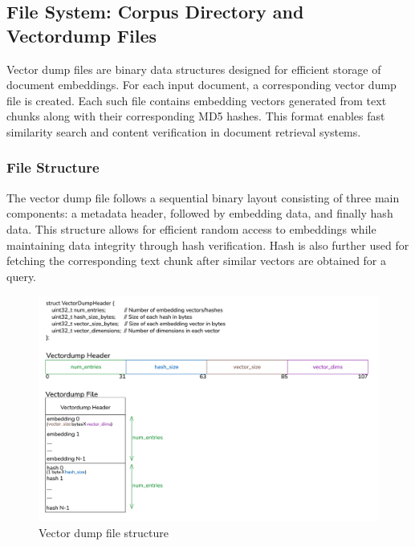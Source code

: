 \subsection{File System: Corpus Directory and Vectordump Files}
\label{subsec:FSandVectordump_files}
Vector dump files are binary data structures designed for efficient storage of document embeddings. For each input document, a corresponding vector dump file is created. Each such file contains embedding vectors generated from text chunks along with their corresponding MD5 hashes. This format enables fast similarity search and content verification in document retrieval systems.

\subsubsection{File Structure}
\label{subsec:Vectordump_FileStructure}
The vector dump file follows a sequential binary layout consisting of three main components: a metadata header, followed by embedding data, and finally hash data. This structure allows for efficient random access to embeddings while maintaining data integrity through hash verification. Hash is also further used for fetching the corresponding text chunk after similar vectors are obtained for a query.

   \begin{figure}[H]
    \centering
    \includegraphics[width=1.0\linewidth]{images/VectorDumpFiles.png}
    \caption{Vector dump file structure}
    \label{fig:vectordumpfilestructure}
\end{figure}

